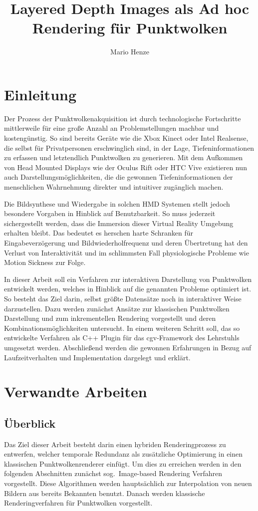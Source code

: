 \documentclass[hyperref, beleg, german]{cgvpub}
\author{Mario Henze}
\title{Layered Depth Images als Ad hoc Rendering für Punktwolken}
\begin{document}
\chapter{Einleitung}%
\label{sec:einleitung}

Der Prozess der Punktwolkenakquisition ist durch technologische Fortschritte
mittlerweile für eine große Anzahl an Problemstellungen machbar und
kostengünstig. So sind bereits Geräte wie die Xbox Kinect oder Intel
Realsense, die selbst für Privatpersonen erschwinglich sind, in der Lage,
Tiefeninformationen zu erfassen und letztendlich Punktwolken zu generieren. Mit
dem Aufkommen von Head Mounted Displays wie der Oculus Rift oder HTC Vive
existieren nun auch Darstellungsmöglichkeiten, die die gewonnen
Tiefeninformationen der menschlichen Wahrnehmung direkter und intuitiver
zugänglich machen.

Die Bildsynthese und Wiedergabe in solchen HMD Systemen stellt jedoch besondere
Vorgaben in Hinblick auf Benutzbarkeit. So muss jederzeit sichergestellt werden,
dass die Immersion dieser Virtual Reality Umgebung erhalten bleibt. Das bedeutet
es herschen harte Schranken für Eingabeverzögerung und Bildwiederholfrequenz und
deren Übertretung hat den Verlust von Interaktivität und im schlimmsten Fall
physiologische Probleme wie Motion Sickness zur Folge.

In dieser Arbeit soll ein Verfahren zur interaktiven Darstellung von
Punktwolken entwickelt werden, welches in Hinblick auf die genannten Probleme
optimiert ist. So besteht das Ziel darin, selbst größte Datensätze noch in
interaktiver Weise darzustellen. Dazu werden zunächst Ansätze zur klassischen
Punktwolken Darstellung und zum inkrementellen Rendering vorgestellt und deren
Kombinationsmöglichkeiten untersucht. In einem weiteren Schritt soll, das so
entwickelte Verfahren als C++ Plugin für das cgv-Framework des Lehrstuhls
umgesetzt werden. Abschließend werden die gewonnen Erfahrungen in Bezug auf
Laufzeitverhalten und Implementation dargelegt und erklärt.

\chapter{Verwandte Arbeiten}%
\label{sec:verwandte_arbeiten}

\section{Überblick}

Das Ziel dieser Arbeit besteht darin einen hybriden Renderingprozess zu
entwerfen, welcher temporale Redundanz als zusätzliche Optimierung in einen
klassischen Punktwolkenrenderer einfügt. Um dies zu erreichen werden in den
folgenden Abschnitten zunächst sog.\ Image-based Rendering Verfahren
vorgestellt. Diese Algorithmen werden hauptsächlich zur Interpolation von neuen
Bildern aus bereits Bekannten benutzt. Danach werden klassische
Renderingverfahren für Punktwolken vorgestellt.
\end{document}
